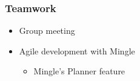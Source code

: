 \documentclass{beamer}
\begin{document}
\begin{frame}
\frametitle{Teamwork}
\begin{itemize}
\item Group meeting
\item Agile development with Mingle
\begin{itemize}
\item Mingle's Planner feature
\end{itemize}
\end{itemize}
\begin{figure}[h]
\end{figure}
\end{frame}
\end{document}
